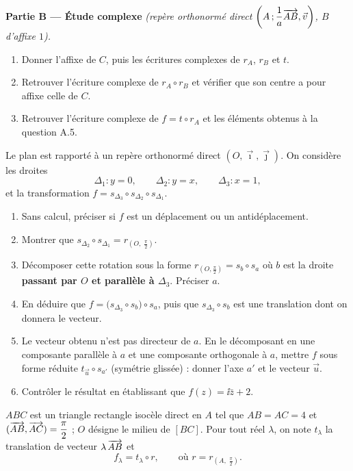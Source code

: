 \textbf{Partie B — Étude complexe} \emph{(repère orthonormé direct
$\left(A\,;\dfrac1a\overrightarrow{AB},\vec v\right)$, $B$ d'affixe $1$).}
\begin{enumerate}
	\item Donner l'affixe de $C$, puis les écritures complexes de $r_A$, $r_B$
	et $t$.
	\item Retrouver l'écriture complexe de $r_A\circ r_B$ et vérifier que son
	centre a pour affixe celle de $C$.
	\item Retrouver l'écriture complexe de $f=t\circ r_A$ et les éléments
	obtenus à la question A.5.
\end{enumerate}


Le plan est rapporté à un repère orthonormé direct $(O,\vec\imath,\vec\jmath)$.
On considère les droites
$$
\Delta_1 : y = 0,\qquad \Delta_2 : y = x,\qquad \Delta_3 : x = 1,
$$
et la transformation $f = s_{\Delta_3}\circ s_{\Delta_2}\circ s_{\Delta_1}$.
\begin{enumerate}
	\item Sans calcul, préciser si $f$ est un déplacement ou un
	antidéplacement.
	\item Montrer que $s_{\Delta_2}\circ s_{\Delta_1} = r_{\left(O,\;\frac{\pi}{2}\right)}$.
	\item Décomposer cette rotation sous la forme
	$r_{\left(O,\frac{\pi}{2}\right)} = s_{b}\circ s_{a}$ où $b$ est la droite
	\textbf{passant par $O$ et parallèle à $\Delta_3$}. Préciser $a$.
	\item En déduire que $f = \bigl(s_{\Delta_3}\circ s_{b}\bigr)\circ s_{a}$,
	puis que $s_{\Delta_3}\circ s_{b}$ est une translation dont on donnera le
	vecteur.
	\item Le vecteur obtenu n'est pas directeur de $a$. En le décomposant en
	une composante parallèle à $a$ et une composante orthogonale à $a$, mettre
	$f$ sous forme réduite $t_{\vec u}\circ s_{a'}$ (symétrie glissée) : donner
	l'axe $a'$ et le vecteur $\vec u$.
	\item Contrôler le résultat en établissant que $f(z) = \ii\bar z + 2$.
\end{enumerate}


$ABC$ est un triangle rectangle isocèle direct en $A$ tel que $AB = AC = 4$
et $(\overrightarrow{AB},\overrightarrow{AC}) = \dfrac{\pi}{2}$ ; $O$ désigne le milieu de $[BC]$.
Pour tout réel $\lambda$, on note $t_\lambda$ la translation de vecteur
$\lambda\,\overrightarrow{AB}$ et
$$
f_\lambda = t_\lambda\circ r,\qquad \text{où } r = r_{\left(A,\;\frac{\pi}{2}\right)}.
$$

